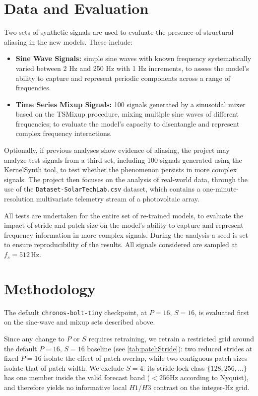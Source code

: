 \section{Data and Evaluation}
Two sets of synthetic signals are used to evaluate the presence of structural aliasing in the new models. These include:
\begin{itemize}
    \item \textbf{Sine Wave Signals:} simple sine waves with known frequency systematically varied between 2 Hz and 250 Hz with 1 Hz increments, to assess the model's ability to capture and represent periodic components across a range of frequencies.
    \item \textbf{Time Series Mixup Signals:} 100 signals generated by a sinusoidal mixer based on the TSMixup procedure\cite{ansariChronosLearningLanguage2024}, mixing multiple sine waves of different frequencies; to evaluate the model's capacity to disentangle and represent complex frequency interactions.
\end{itemize}

Optionally, if previous analyses show evidence of aliasing, the project may analyze test signals from a third set, including 100 signals generated using the KernelSynth\cite{ansariChronosLearningLanguage2024} tool, to test whether the phenomenon persists in more complex signals. The project then focuses on the analysis of real-world data, through the use of the \texttt{Dataset-SolarTechLab.csv} dataset, which contains a one-minute-resolution multivariate telemetry stream of a photovoltaic array\cite{levaPhotovoltaicPowerWeather2020}.

All tests are undertaken for the entire set of re-trained models, to evaluate the impact of stride and patch size on the model's ability to capture and represent frequency information in more complex signals. During the analysis a seed is set to ensure reproducibility of the results. All signals considered are sampled at $f_s = 512$\,Hz.

\section{Methodology}


The default \texttt{chronos-bolt-tiny} checkpoint, at $P{=}16,\,S{=}16$, is evaluated first on the sine-wave and mixup sets described above.

Since any change to $P$ or $S$ requires retraining, we retrain a restricted grid around the default $P=16,\,S=16$ baseline (see \autoref{tab:patchStride}): two reduced strides at fixed $P=16$ isolate the effect of patch overlap, while two contiguous patch sizes isolate that of patch width. We exclude $S=4$: its stride-lock class $\{128,256,\dots\}$ has one member inside the valid forecast band ($< 256 \mathrm{Hz}$ according to Nyquist), and therefore yields no informative local $H1$/$H3$ contrast on the integer-Hz grid.


